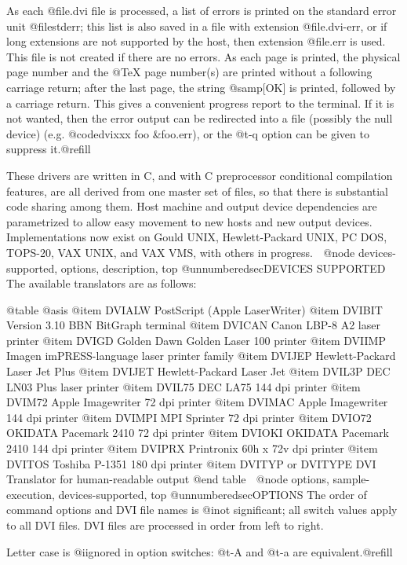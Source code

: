 As each @file{.dvi} file is processed, a list of errors is printed
on the standard error unit @file{stderr}; this list is also saved
in a file with extension @file{.dvi-err}, or if long extensions
are not supported by the host, then extension @file{.err} is
used.  This file is not created if there are no errors.  As each
page is printed, the physical page number and the @TeX{} page
number(s) are printed without a following carriage return; after the
last page, the string @samp{[OK]} is printed, followed by a
carriage return.  This gives a convenient progress report to the
terminal.  If it is not wanted, then the error output can be
redirected into a file (possibly the null device) (e.g.
@code{dvixxx foo &foo.err}), or the @t{-q} option can be given to
suppress it.@refill

These drivers are written in C, and with C preprocessor
conditional compilation features, are all derived from one
master set of files, so that there is substantial code
sharing among them.  Host machine and output device
dependencies are parametrized to allow easy movement to new
hosts and new output devices.  Implementations now exist on
Gould UNIX, Hewlett-Packard UNIX, PC DOS, TOPS-20, VAX UNIX,
and VAX VMS, with others in progress.

@node devices-supported, options, description, top
@unnumberedsec{DEVICES SUPPORTED}
The available translators are as follows:

@table @asis
@item DVIALW
PostScript (Apple LaserWriter)
@item DVIBIT
Version 3.10 BBN BitGraph terminal
@item DVICAN
Canon LBP-8 A2 laser printer
@item DVIGD
Golden Dawn Golden Laser 100 printer
@item DVIIMP
Imagen imPRESS-language laser printer family
@item DVIJEP
Hewlett-Packard Laser Jet Plus
@item DVIJET
Hewlett-Packard Laser Jet
@item DVIL3P
DEC LN03 Plus laser printer
@item DVIL75
DEC LA75 144 dpi printer
@item DVIM72
Apple Imagewriter 72 dpi printer
@item DVIMAC
Apple Imagewriter 144 dpi printer
@item DVIMPI
MPI Sprinter 72 dpi printer
@item DVIO72
OKIDATA Pacemark 2410 72 dpi printer
@item DVIOKI
OKIDATA Pacemark 2410 144 dpi printer
@item DVIPRX
Printronix 60h  x  72v dpi printer
@item DVITOS
Toshiba P-1351 180 dpi printer
@item DVITYP or DVITYPE
DVI Translator for human-readable output
@end table

@node options, sample-execution, devices-supported, top
@unnumberedsec{OPTIONS}
The order of command options and DVI file names is @i{not}
significant; all switch values apply to all DVI files.  DVI files
are processed in order from left to right.

Letter case is @i{ignored} in option switches: @t{-A}
and  @t{-a} are equivalent.@refill

